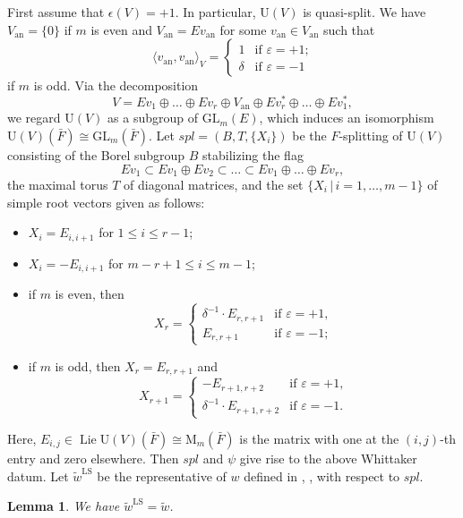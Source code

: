 \documentclass[11pt]{amsart}
\numberwithin{equation}{section}
\theoremstyle{plain}
\newtheorem{lem}[thm]{Lemma}
\theoremstyle{definition}
\theoremstyle{remark}
\def\an{\mathrm{an}}
\def\GL{\mathrm{GL}}
\def\LS{\mathrm{LS}}
\def\U{\mathrm{U}}
\def\spl{\boldsymbol{\mathit{spl}}}
\begin{document}
First assume that $\epsilon(V) = +1$.
In particular, $\U(V)$ is quasi-split.
We have $V_\an = \{ 0 \}$ if $m$ is even and $V_\an = E v_\an$ for some $v_\an \in V_\an$ such that 
\[
 \langle v_\an, v_\an \rangle_V = 
 \begin{cases}
  1 & \text{if $\varepsilon = +1$;} \\
  \delta & \text{if $\varepsilon = -1$}
 \end{cases}
\]
if $m$ is odd.
Via the decomposition
\[
 V = E v_1 \oplus \dots  \oplus E v_r \oplus V_\an \oplus E v_r^* \oplus \dots  \oplus E v_1^*,
\]
we regard $\U(V)$ as a subgroup of $\GL_m(E)$, which induces an isomorphism $\U(V)(\bar{F}) \cong \GL_m(\bar{F})$.
Let $\spl = (B,T,\{ X_i \})$ be the $F$-splitting of $\U(V)$ consisting of the Borel subgroup $B$ stabilizing the flag
\[
 E v_1 \subset E v_1 \oplus E v_2 \subset \dots \subset E v_1 \oplus \dots  \oplus E v_r,
\]
the maximal torus $T$ of diagonal matrices, and the set $\{ X_i \, | \, i = 1, \ldots, m-1 \}$ of simple root vectors given as follows:
\begin{itemize}
 \item $X_i = E_{i,i+1}$ for $1 \le i \le r-1$;
 \item $X_i = -E_{i,i+1}$ for $m-r+1 \le i \le m-1$;
 \item if $m$ is even, then
 \[
  X_r = 
  \begin{cases}
   \delta^{-1} \cdot E_{r,r+1} & \text{if $\varepsilon = +1$,} \\
   E_{r,r+1} & \text{if $\varepsilon = -1$;}
  \end{cases}
 \]
 \item if $m$ is odd, then $X_r = E_{r,r+1}$ and 
 \[
  X_{r+1} = 
  \begin{cases}
   -E_{r+1,r+2} & \text{if $\varepsilon = +1$,} \\
   \delta^{-1} \cdot E_{r+1,r+2} & \text{if $\varepsilon = -1$.}
  \end{cases}
 \]
\end{itemize}
Here, $E_{i,j} \in \operatorname{Lie} \U(V)(\bar{F}) \cong \mathrm{M}_m(\bar{F})$ is the matrix with one at the $(i,j)$-th entry and zero elsewhere.
Then $\spl$ and $\psi$ give rise to the above Whittaker datum.
Let $\tilde{w}^{\LS}$ be the representative of $w$ defined in \cite[\S 2.1]{ls}, \cite[\S 2.3]{a}, \cite[\S 3.3]{mok} with respect to $\spl$.

\begin{lem}
\label{lem:weyl}
We have $\tilde{w}^{\LS} = \tilde{w}$.
\end{lem}
\end{document}
